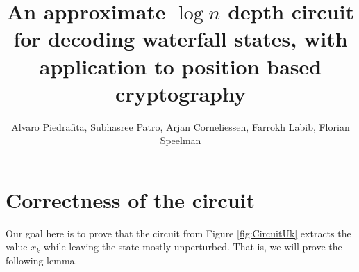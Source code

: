 \documentclass{article}
\theoremstyle{definition}
\begin{document}
\title{\large {\bf An approximate $\log n$ depth circuit for decoding waterfall states, with application to position based cryptography}}
\author{Alvaro Piedrafita, Subhasree Patro, Arjan Corneliessen, Farrokh Labib, Florian Speelman}
\maketitle





\section{Correctness of the circuit}

Our goal here is to prove that the circuit from Figure \ref{fig:CircuitUk} extracts the value $x_k$ while leaving the state mostly unperturbed. That is, we will prove the following lemma.
\end{document}
